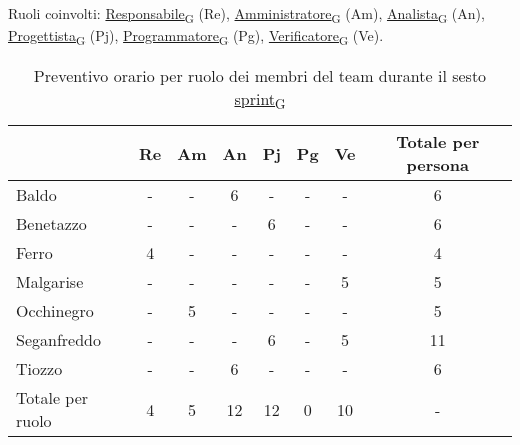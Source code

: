 \newpage
{}
Ruoli coinvolti: \href{https://7last.github.io/docs/pb/documentazione-interna/glossario\#responsabile}{Responsabile\textsubscript{G}} (Re), \href{https://7last.github.io/docs/pb/documentazione-interna/glossario\#amministratore}{Amministratore\textsubscript{G}} (Am), \href{https://7last.github.io/docs/pb/documentazione-interna/glossario\#analista}{Analista\textsubscript{G}} (An), \href{https://7last.github.io/docs/pb/documentazione-interna/glossario\#progettista}{Progettista\textsubscript{G}} (Pj), \href{https://7last.github.io/docs/pb/documentazione-interna/glossario\#programmatore}{Programmatore\textsubscript{G}} (Pg), \href{https://7last.github.io/docs/pb/documentazione-interna/glossario\#verificatore}{Verificatore\textsubscript{G}} (Ve).
\begin{table}[!h]
	\centering
	\begin{tabular}{ | l | c | c | c | c | c | c | c | }
		\hline
		\textbf{} & \textbf{Re} & \textbf{Am} &\textbf{An} & \textbf{Pj} & \textbf{Pg} & \textbf{Ve} & \textbf{Totale per persona} \\
		\hline
		Baldo            &  -   &  -   &  6   &  -   &  -   &  -   &  6   \\
		Benetazzo        &  -   &  -   &  -   &  6   &  -   &  -   &  6   \\
		Ferro            &  4   &  -   &  -   &  -   &  -   &  -   &  4   \\
		Malgarise        &  -   &  -   &  -   &  -   &  -   &  5   &  5   \\
		Occhinegro       &  -   &  5   &  -   &  -   &  -   &  -   &  5   \\
		Seganfreddo      &  -   &  -   &  -   &  6   &  -   &  5   &  11   \\
		Tiozzo           &  -   &  -   &  6   &  -   &  -   &  -   &  6   \\
		\hline
		Totale per ruolo &  4   &  5   &  12   &  12   &  0   &  10   &  -   \\
		\hline
	\end{tabular}
	\caption{Preventivo orario per ruolo dei membri del team durante il sesto \href{https://7last.github.io/docs/pb/documentazione-interna/glossario\#sprint}{sprint\textsubscript{G}}}

\end{table}

